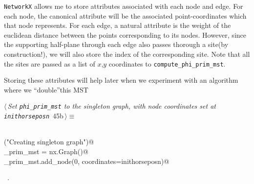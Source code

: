 \documentclass[11.5pt]{report}
\begin{document}
\begin{center}
\end{center}
\label{fig:animating-growth-of-phi-prim-mst}

\newchunk \verb|NetworkX| allows me to store attributes associated with each node 
and edge. For each node, the canonical attribute will be the associated point-coordinates 
which that node represents. For each edge, a natural attribute is the weight of the 
euclidean distance between the points corresponding to its nodes. However, since the 
supporting half-plane through each edge also passes thorough a site(by construction!), 
we will also store the index of the corresponding site. Note that all the sites are passed 
as a list of $x$,$y$ coordinates to \verb|compute_phi_prim_mst|. 

Storing these attributes will help later when we experiment with an algorithm where 
we ``double''this MST
\begin{flushleft} \small
\begin{minipage}{\linewidth}\label{scrap66}\raggedright\small
{} $\langle\,${\itshape Set \verb|phi_prim_mst| to the singleton graph, with node coordinates set at \verb|inithorseposn|}\nobreak\ {\footnotesize {45b}}$\,\rangle\equiv$
\vspace{-1ex}
\begin{list}{}{} \item
\mbox{}\verb@@\\
\mbox{}\verb@info("Creating singleton graph")@\\
\mbox{}\verb@phi_prim_mst = nx.Graph()@\\
\mbox{}\verb@phi_prim_mst.add_node(0, coordinates=inithorseposn)@\\
\mbox{}\verb@@{\NWsep}
\end{list}
\vspace{-1.5ex}
\footnotesize
\begin{list}{}{\setlength{\itemsep}{-\parsep}\setlength{\itemindent}{-\leftmargin}}
\item \NWtxtMacroRefIn\ .

\item{}
\end{list}
\end{minipage}\vspace{4ex}
\end{flushleft}
\end{document}
